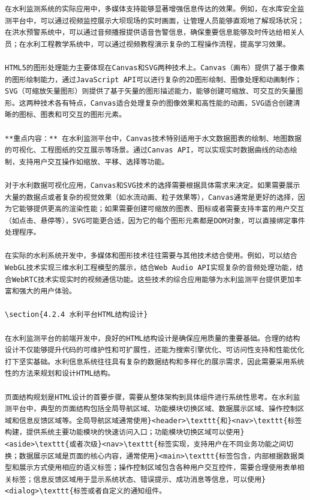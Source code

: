 \begin{lstlisting}
在水利监测系统的实际应用中，多媒体支持能够显著增强信息传达的效果。例如，在水库安全监测平台中，可以通过视频监控展示大坝现场的实时画面，让管理人员能够直观地了解现场状况；在洪水预警系统中，可以通过音频播报提供语音告警信息，确保重要信息能够及时传达给相关人员；在水利工程教学系统中，可以通过视频教程演示复杂的工程操作流程，提高学习效果。

HTML5的图形处理能力主要体现在Canvas和SVG两种技术上。Canvas（画布）提供了基于像素的图形绘制能力，通过JavaScript API可以进行复杂的2D图形绘制、图像处理和动画制作；SVG（可缩放矢量图形）则提供了基于矢量的图形描述能力，能够创建可缩放、可交互的矢量图形。这两种技术各有特点，Canvas适合处理复杂的图像效果和高性能的动画，SVG适合创建清晰的图标、图表和可交互的图形元素。

**重点内容：** 在水利监测平台中，Canvas技术特别适用于水文数据图表的绘制、地图数据的可视化、工程图纸的交互展示等场景。通过Canvas API，可以实现实时数据曲线的动态绘制，支持用户交互操作如缩放、平移、选择等功能。

对于水利数据可视化应用，Canvas和SVG技术的选择需要根据具体需求来决定。如果需要展示大量的数据点或者复杂的视觉效果（如水流动画、粒子效果等），Canvas通常是更好的选择，因为它能够提供更高的渲染性能；如果需要创建可缩放的图表、图标或者需要支持丰富的用户交互（如点击、悬停等），SVG可能更合适，因为它的每个图形元素都是DOM对象，可以直接绑定事件处理程序。

在实际的水利系统开发中，多媒体和图形技术往往需要与其他技术结合使用。例如，可以结合WebGL技术实现三维水利工程模型的展示，结合Web Audio API实现复杂的音频处理功能，结合WebRTC技术实现实时的视频通信功能。这些技术的综合应用能够为水利监测平台提供更加丰富和强大的用户体验。

\section{4.2.4 水利平台HTML结构设计}

在水利监测平台的前端开发中，良好的HTML结构设计是确保应用质量的重要基础。合理的结构设计不仅能够提升代码的可维护性和可扩展性，还能为搜索引擎优化、可访问性支持和性能优化打下坚实基础。水利信息系统往往具有复杂的数据结构和多样化的展示需求，因此需要采用系统性的方法来规划和设计HTML结构。

页面结构规划是HTML设计的首要步骤，需要从整体架构到具体组件进行系统性思考。在水利监测平台中，典型的页面结构包括全局导航区域、功能模块切换区域、数据展示区域、操作控制区域和信息反馈区域等。全局导航区域通常使用}<header>\texttt{和}<nav>\texttt{标签构建，提供系统主要功能模块的快速访问入口；功能模块切换区域可以使用}<aside>\texttt{或者次级}<nav>\texttt{标签实现，支持用户在不同业务功能之间切换；数据展示区域是页面的核心内容，通常使用}<main>\texttt{标签包含，内部根据数据类型和展示方式使用相应的语义标签；操作控制区域包含各种用户交互控件，需要合理使用表单相关标签；信息反馈区域用于显示系统状态、错误提示、成功消息等信息，可以使用}<dialog>\texttt{标签或者自定义的通知组件。


\end{lstlisting}
